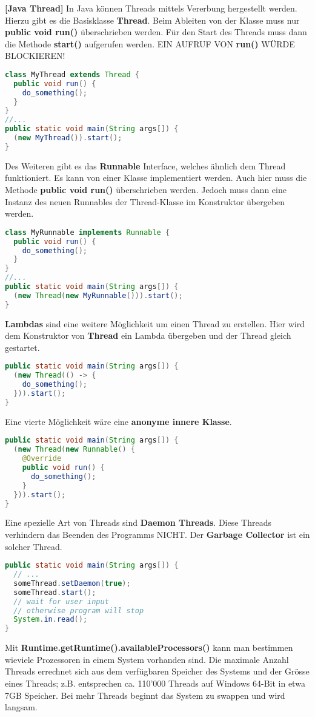 \documentclass[8pt]{extarticle}
\let\oldtextbf\textbf
\renewcommand{\textbf}{\tiny\oldtextbf}
\begin{document}
\begin{multicols*}{5}
\textbf{[Java Thread]}
In Java können Threads mittels Vererbung hergestellt werden. Hierzu gibt es die Basisklasse \textbf{Thread}. Beim Ableiten von der Klasse muss nur \textbf{public void run()} überschrieben werden. Für den Start des Threads muss dann die Methode \textbf{start()} aufgerufen werden. EIN AUFRUF VON \textbf{run()} WÜRDE BLOCKIEREN!
\begin{lstlisting}[language=java]
class MyThread extends Thread {
  public void run() {
    do_something();
  }
}
//...
public static void main(String args[]) {
  (new MyThread()).start();
}
\end{lstlisting}
Des Weiteren gibt es das \textbf{Runnable} Interface, welches ähnlich dem Thread funktioniert. Es kann von einer Klasse implementiert werden. Auch hier muss die Methode \textbf{public void run()} überschrieben werden. Jedoch muss dann eine Instanz des neuen Runnables der Thread-Klasse im Konstruktor übergeben werden.
\begin{lstlisting}[language=java]
class MyRunnable implements Runnable {
  public void run() {
    do_something();
  }
}
//...
public static void main(String args[]) {
  (new Thread(new MyRunnable())).start();
}
\end{lstlisting}
\textbf{Lambdas} sind eine weitere Möglichkeit um einen Thread zu erstellen. Hier wird dem Konstruktor von \textbf{Thread} ein Lambda übergeben und der Thread gleich gestartet.
\begin{lstlisting}[language=java]
public static void main(String args[]) {
  (new Thread(() -> {
    do_something();
  })).start();
}
\end{lstlisting}
Eine vierte Möglichkeit wäre eine \textbf{anonyme innere Klasse}.
\begin{lstlisting}[language=java]
public static void main(String args[]) {
  (new Thread(new Runnable() {
    @Override
    public void run() {
      do_something();
    }
  })).start();
}
\end{lstlisting}
Eine spezielle Art von Threads sind \textbf{Daemon Threads}. Diese Threads verhindern das Beenden des Programms NICHT. Der \textbf{Garbage Collector} ist ein solcher Thread.
\begin{lstlisting}[language=java]
public static void main(String args[]) {
  // ...
  someThread.setDaemon(true);
  someThread.start();
  // wait for user input
  // otherwise program will stop
  System.in.read();
}
\end{lstlisting}
Mit \textbf{Runtime.getRuntime().availableProcessors()} kann man bestimmen wieviele Prozessoren in einem System vorhanden sind. Die maximale Anzahl Threads errechnet sich aus dem verfügbaren Speicher des Systems und der Grösse eines Threads; z.B. entsprechen ca. 110'000 Threads auf Windows 64-Bit in etwa 7GB Speicher. Bei mehr Threads beginnt das System zu swappen und wird langsam.\\\\

\end{multicols*}
\end{document}
